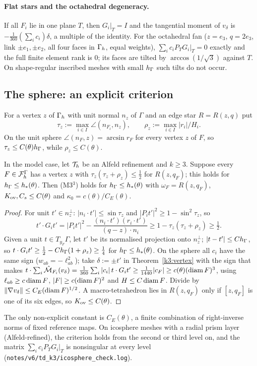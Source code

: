 \paragraph{Flat stars and the octahedral degeneracy.} If all $F_i$ lie in one plane $T$, then $G_i|_T=I$ and the tangential moment of $v_\delta$ is $-\frac1{360}(\sum_ic_i)\delta$, a multiple of the identity. For the octahedral fan ($z=e_3$, $q=2e_3$, link $\pm e_1,\pm e_2$, all four faces in $\Gamma_h$, equal weights), $\sum_ic_iP_TG_i|_T=0$ exactly and the full finite element rank is $0$; its faces are tilted by $\arccos(1/\sqrt3)$ against $T$. On shape-regular inscribed meshes with small $h_\Gamma$ such tilts do not occur.

\subsection{The sphere: an explicit criterion}
For a vertex $z$ of $\Gamma_h$ with unit normal $n_z$ of $\Gamma$ and an edge star $R=R(z,q)$ put
\[
\tau_z:=\max_{i\in I}\angle(n_{F_i},n_z),\qquad\rho_z:=\max_{i\in I}|r_i|/H_i .
\]
On the unit sphere $\angle(n_F,z)=\arcsin r_F$ for every vertex $z$ of $F$, so $\tau_z\le C(\theta)h_\Gamma$, while $\rho_z\le C(\theta)$.

\begin{theorem}[(M3$^3$) for $k=3$ on the sphere, explicit]\label{k3:sphere}
In the model case, let $\mathcal T_h$ be an Alfeld refinement and $k\ge3$. Suppose every $F\in\mathcal F_h^\Gamma$ has a vertex $z$ with $\tau_z(\tau_z+\rho_z)\le\frac12$ for $R(z,q_F)$; this holds for $h_\Gamma\le h_\ast(\theta)$. Then (M3$^3$) holds for $h_\Gamma\le h_\ast(\theta)$ with $\omega_F=R(z,q_F)$, $K_{\rm ov},C_s\le C(\theta)$ and $\kappa_0=c(\theta)/C_E(\theta)$.
\end{theorem}

\begin{proof}
For unit $t'\in n_z^\perp$: $|n_i\cdot t'|\le\sin\tau_z$ and $|P_it'|^2\ge1-\sin^2\tau_z$, so
\[
t'\cdot G_it'=|P_it'|^2-\frac{(n_i\cdot t')(r_i\cdot t')}{(q-z)\cdot n_i}\ge1-\tau_z(\tau_z+\rho_z)\ge\tfrac12 .
\]
Given a unit $t\in T_{y_F}\Gamma$, let $t'$ be its normalised projection onto $n_z^\perp$; $|t-t'|\le Ch_\Gamma$, so $t\cdot G_it'\ge\frac12-Ch_\Gamma(1+\rho_z)\ge\frac14$ for $h_\Gamma\le h_\ast(\theta)$. On the sphere all $c_i$ have the same sign ($w_{ab}=-\ell_{ab}^2$); take $\delta:=\pm t'$ in Theorem~\ref{k3:vertex} with the sign that makes $t\cdot\sum_i\hat{\mathcal M}_{F_i}(v_\delta)=\frac1{360}\sum_i|c_i|\,t\cdot G_it'\ge\frac1{1440}|c_F|\ge c(\theta)(\operatorname{diam} F)^3$, using $\ell_{ab}\ge c\operatorname{diam} F$, $|F|\ge c(\operatorname{diam} F)^2$ and $H\le C\operatorname{diam} F$. Divide by $\lVert \nabla v_\delta\rVert\le C_E(\operatorname{diam} F)^{1/2}$. A macro-tetrahedron lies in $R(z,q_F)$ only if $[z,q_F]$ is one of its six edges, so $K_{\rm ov}\le C(\theta)$.
\end{proof}
The only non-explicit constant is $C_E(\theta)$, a finite combination of right-inverse norms of fixed reference maps. On icosphere meshes with a radial prism layer (Alfeld-refined), the criterion holds from the second or third level on, and the matrix $\sum_ic_iP_TG_i|_T$ is nonsingular at every level (\texttt{notes/v6/td\_k3/icosphere\_check.log}). 

